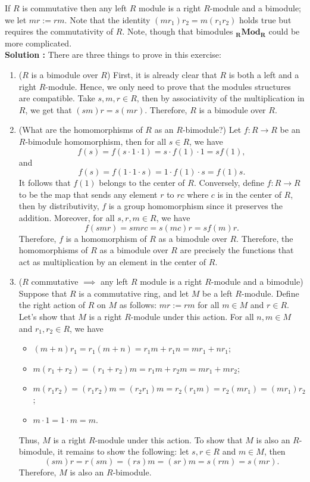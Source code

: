 \documentclass{article}
\newcommand{\CatMod}[1]{_\textbf{#1}\textbf{Mod}}
\begin{document}
If $R$ is commutative then any left $R$ module is a right $R$-module and a bimodule; we let $mr := rm$. Note that the identity $(mr_1)r_2 = m(r_1r_2)$ holds true but requires the commutativity of $R$. Note, though that bimodules $\CatMod{R}_{\textbf{R}}$ could be more complicated. \\

\noindent \textbf{Solution :} There are three things to prove in this exercise:
\begin{enumerate}
    \item ($R$ is a bimodule over $R$) First, it is already clear that $R$ is both a left and a right $R$-module. Hence, we only need to prove that the modules structures are compatible. Take $s,m,r \in R$, then by associativity of the multiplication in $R$, we get that $(sm)r = s(mr)$. Therefore, $R$ is a bimodule over $R$. 
    \item (What are the homomorphisms of $R$ as an $R$-bimodule?) Let $f: R \to R$ be an $R$-bimodule homomorphism, then for all $s \in R$, we have 
    $$f(s) = f(s \cdot 1 \cdot 1) = s \cdot f(1)\cdot 1 = sf(1),$$ and
    $$f(s) = f(1 \cdot 1 \cdot s) = 1 \cdot f(1)\cdot s = f(1)s.$$
    It follows that $f(1)$ belongs to the center of $R$. Conversely, define $f : R \to R$ to be the map that sends any element $r$ to $rc$ where $c$ is in the center of $R$, then by distributivity, $f$ is a group homomorphism since it preserves the addition. Moreover, for all $s,r,m \in R$, we have
    $$f(smr) = smrc = s(mc)r = sf(m)r.$$
    Therefore, $f$ is a homomorphism of $R$ as a bimodule over $R$. Therefore, the homomorphisms of $R$ as a bimodule over $R$ are precisely the functions that act as multiplication by an element in the center of $R$.
    \item ($R$ commutative $\implies$ any left $R$ module is a right $R$-module and a bimodule) Suppose that $R$ is a commutative ring, and let $M$ be a left $R$-module. Define the right action of $R$ on $M$ as follows: $mr := rm$ for all $m \in M$ and $r \in R$. Let's show that $M$ is a right $R$-module under this action. For all $n, m \in M$ and $r_1,r_2 \in R$, we have
    \begin{itemize}
        \item $(m+n)r_1 = r_1(m+n) = r_1m + r_1n = mr_1 + nr_1$;
        \item $m(r_1+r_2) = (r_1+r_2)m = r_1m + r_2m = mr_1 + mr_2$;
        \item $m(r_1r_2) = (r_1r_2)m = (r_2r_1)m = r_2(r_1m) = r_2(mr_1) = (mr_1)r_2$;
        \item $m\cdot 1 = 1\cdot m = m$.
    \end{itemize}
    Thus, $M$ is a right $R$-module under this action. To show that $M$ is also an $R$-bimodule, it remains to show the following: let $s,r \in R$ and $m \in M$, then 
    $$(sm)r = r(sm) = (rs)m = (sr)m = s(rm) = s(mr).$$ 
    Therefore, $M$ is also an $R$-bimodule.
\end{enumerate}
\end{document}
